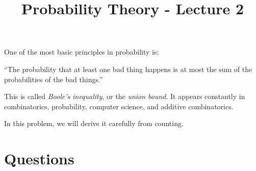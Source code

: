 \documentclass[12pt]{article}
\title{Probability Theory - Lecture 2}
\author{}
\date{}
\begin{document}
\maketitle

One of the most basic principles in probability is:

\begin{center}
``The probability that at least one bad thing happens
is at most the sum of the probabilities of the bad things.''
\end{center}

This is called \textit{Boole's inequality}, or the \textit{union bound}.
It appears constantly in combinatorics, probability, computer science,
and additive combinatorics.

In this problem, we will derive it carefully from counting.

\section*{Questions}
\end{document}
